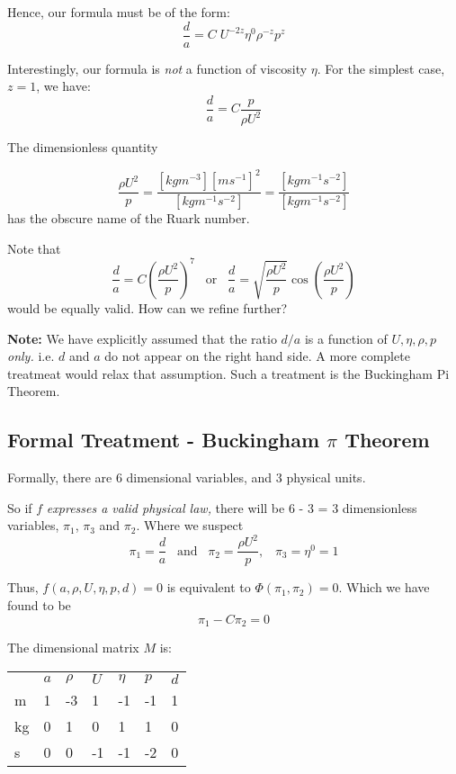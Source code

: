 \documentclass[]{article}
\begin{document}
Hence, our formula must be of the form:
\[ \frac{d}{a} = C \; U^{-2z} \eta^{0} \rho^{-z} p^{z} \]

Interestingly, our formula is \emph{not} a function of viscosity $\eta$.
For the simplest case, $z=1$, we have:
\[ \frac{d}{a} = C \frac{p}{\rho U^2} \]

The dimensionless quantity

\[ \frac{\rho U^2}{p} = \frac{[kg m^{-3}] [m s^{-1}]^2}{[kg m^{-1} s^{-2}]} = \frac{[kg m^{-1} s^{-2}]}{[kg m^{-1} s^{-2}]} \]
has the obscure name of the Ruark number.

Note that
\[ \frac{d}{a} = C \left( \frac{\rho U^2}{p} \right)^7
\;\;\; \text{or} \;\;\;
\frac{d}{a} = \sqrt{ \frac{\rho U^2}{p} } \cos \left( \frac{\rho U^2}{p} \right) \]
would be equally valid.  How can we refine further?

\vspace{2em}
\textbf{Note:} We have explicitly assumed that the ratio $d/a$ is a function of $U, \eta, \rho, p$ \emph{only.} i.e. $d$ and $a$ do not appear on the right hand side. A more complete treatmeat would relax that assumption.  Such a treatment is the Buckingham Pi Theorem.

\pagebreak

\subsection*{Formal Treatment - Buckingham $\pi$ Theorem }

Formally, there are 6 dimensional variables, and 3 physical units.

So if $f$ \emph{expresses a valid physical law,} there will be 
6 - 3 = 3 dimensionless variables, $\pi_1$, $\pi_3$ and $\pi_2$.
Where we suspect
\[ \pi_1 = \frac{d}{a}\;\;\; \text{and}\;\;\; \pi_2 = \frac{\rho U^2}{p}, \;\;\;\pi_3 = \eta^0 = 1 \]

Thus,  $f(a,\rho ,U,\eta, p, d)=0$ is equivalent to  $\Phi(\pi_1, \pi_2)=0$.
Which we have found to be
\[ \pi_1 - C \pi_2 = 0 \]

\vspace{1em}
The dimensional matrix $M$ is:
\vspace{1em}

\begin{tabular}{l l l l l l l }
   & $a$ & $\rho$ & $U$ & $\eta$ & $p$  & $d$ \\
m  & 1   &  -3    &  1  &   -1   &  -1  & 1  \\
kg & 0   &  1     &  0  &    1   &  1   & 0  \\
s  & 0   &  0     &  -1 &   -1   &  -2  & 0  \\
\end{tabular}
\vspace{1em}
\end{document}
